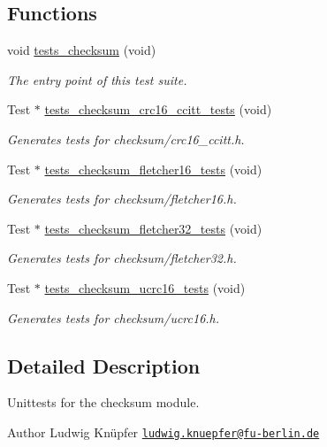 \subsection*{Functions}
\begin{DoxyCompactItemize}
\item 
void \hyperlink{group__unittests_gae22a9f38219373678e7c27dbc0011406}{tests\+\_\+checksum} (void)
\begin{DoxyCompactList}\small\item\em The entry point of this test suite. \end{DoxyCompactList}\item 
Test $\ast$ \hyperlink{group__unittests_gab14760f94862d361e37621a414849ac6}{tests\+\_\+checksum\+\_\+crc16\+\_\+ccitt\+\_\+tests} (void)
\begin{DoxyCompactList}\small\item\em Generates tests for checksum/crc16\+\_\+ccitt.\+h. \end{DoxyCompactList}\item 
Test $\ast$ \hyperlink{group__unittests_gae4f6cce052a84dde051799a5a57d9e44}{tests\+\_\+checksum\+\_\+fletcher16\+\_\+tests} (void)
\begin{DoxyCompactList}\small\item\em Generates tests for checksum/fletcher16.\+h. \end{DoxyCompactList}\item 
Test $\ast$ \hyperlink{group__unittests_gaa0b18302e117209cfda9e5cdc7cd5af8}{tests\+\_\+checksum\+\_\+fletcher32\+\_\+tests} (void)
\begin{DoxyCompactList}\small\item\em Generates tests for checksum/fletcher32.\+h. \end{DoxyCompactList}\item 
Test $\ast$ \hyperlink{group__unittests_gab30c0b0af5fcf4297ab2f8321a2838da}{tests\+\_\+checksum\+\_\+ucrc16\+\_\+tests} (void)
\begin{DoxyCompactList}\small\item\em Generates tests for checksum/ucrc16.\+h. \end{DoxyCompactList}\end{DoxyCompactItemize}


\subsection{Detailed Description}
Unittests for the {\ttfamily checksum} module. 

\begin{DoxyAuthor}{Author}
Ludwig Knüpfer \href{mailto:ludwig.knuepfer@fu-berlin.de}{\tt ludwig.\+knuepfer@fu-\/berlin.\+de} 
\end{DoxyAuthor}
